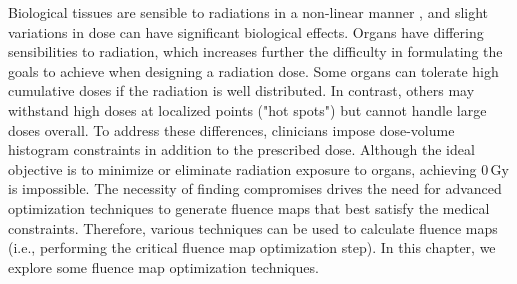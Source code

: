 Biological tissues are sensible to radiations in a non-linear manner \cite{Liu2003}, and slight variations in dose can have significant biological effects.
Organs have differing sensibilities to radiation, which increases further the difficulty in formulating the goals to achieve when designing a radiation dose.
Some organs can tolerate high cumulative doses if the radiation is well distributed.
In contrast, others may withstand high doses at localized points ("hot spots") but cannot handle large doses overall.
To address these differences, clinicians impose dose-volume histogram constraints in addition to the prescribed dose.
Although the ideal objective is to minimize or eliminate radiation exposure to organs, achieving $0\,\text{Gy}$ is impossible.
The necessity of finding compromises drives the need for advanced optimization techniques to generate fluence maps that best satisfy the medical constraints.
Therefore, various techniques can be used to calculate fluence maps (i.e., performing the critical fluence map optimization step).
In this chapter, we explore some fluence map optimization techniques.

